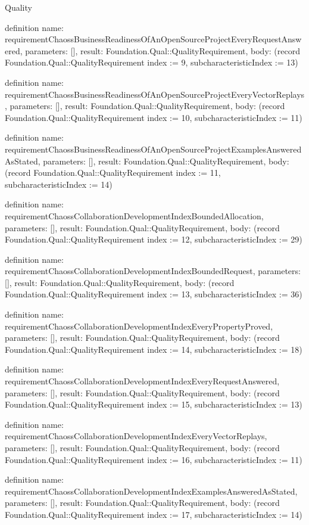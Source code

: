\begin{lexlean}{Quality}
\begin{semanticmodule}
definition{
  name: requirementChaossBusinessReadinessOfAnOpenSourceProjectEveryRequestAnswered,
  parameters: [],
  result: Foundation.Qual::QualityRequirement,
  body: (record Foundation.Qual::QualityRequirement {index := 9, subcharacteristicIndex := 13})
}

definition{
  name: requirementChaossBusinessReadinessOfAnOpenSourceProjectEveryVectorReplays,
  parameters: [],
  result: Foundation.Qual::QualityRequirement,
  body: (record Foundation.Qual::QualityRequirement {index := 10, subcharacteristicIndex := 11})
}

definition{
  name: requirementChaossBusinessReadinessOfAnOpenSourceProjectExamplesAnsweredAsStated,
  parameters: [],
  result: Foundation.Qual::QualityRequirement,
  body: (record Foundation.Qual::QualityRequirement {index := 11, subcharacteristicIndex := 14})
}

definition{
  name: requirementChaossCollaborationDevelopmentIndexBoundedAllocation,
  parameters: [],
  result: Foundation.Qual::QualityRequirement,
  body: (record Foundation.Qual::QualityRequirement {index := 12, subcharacteristicIndex := 29})
}

definition{
  name: requirementChaossCollaborationDevelopmentIndexBoundedRequest,
  parameters: [],
  result: Foundation.Qual::QualityRequirement,
  body: (record Foundation.Qual::QualityRequirement {index := 13, subcharacteristicIndex := 36})
}

definition{
  name: requirementChaossCollaborationDevelopmentIndexEveryPropertyProved,
  parameters: [],
  result: Foundation.Qual::QualityRequirement,
  body: (record Foundation.Qual::QualityRequirement {index := 14, subcharacteristicIndex := 18})
}

definition{
  name: requirementChaossCollaborationDevelopmentIndexEveryRequestAnswered,
  parameters: [],
  result: Foundation.Qual::QualityRequirement,
  body: (record Foundation.Qual::QualityRequirement {index := 15, subcharacteristicIndex := 13})
}

definition{
  name: requirementChaossCollaborationDevelopmentIndexEveryVectorReplays,
  parameters: [],
  result: Foundation.Qual::QualityRequirement,
  body: (record Foundation.Qual::QualityRequirement {index := 16, subcharacteristicIndex := 11})
}

definition{
  name: requirementChaossCollaborationDevelopmentIndexExamplesAnsweredAsStated,
  parameters: [],
  result: Foundation.Qual::QualityRequirement,
  body: (record Foundation.Qual::QualityRequirement {index := 17, subcharacteristicIndex := 14})
}


\end{semanticmodule}
\end{lexlean}
